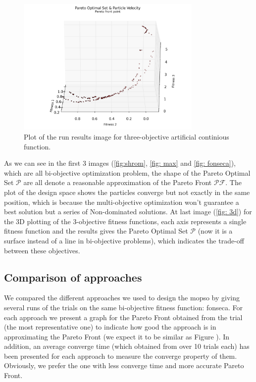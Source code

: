 \documentclass[12pt, runningheads,a4paper]{llncs}
\begin{document}
\begin{figure}
        \centering
    \centering
\includegraphics[width=0.8\textwidth]{./figs/3d.png}
        \caption{Plot of the run results image for three-objective artificial continious function.}\label{fig:3d}
\end{figure}
As we can see in the first 3 images (\ref{fig:shrom}, \ref{fig: max} and \ref{fig: fonseca}), which are all bi-objective optimization problem, the shape of the Pareto Optimal Set  $\mathcal{P}$ are all denote a reasonable approximation of the Pareto Front $\mathcal{PF}$. The plot of the design space shows the particles converge but not exactly in the same position, which is because the multi-objective optimization won't guarantee a best solution but a series of Non-dominated solutions. At last image (\ref{fig: 3d}) for the 3D plotting of the 3-objective fitness functions, each axis represents a single fitness function and the results gives the  Pareto Optimal Set  $\mathcal{P}$ (now it is a surface instead of a line in bi-objective problems), which indicates the trade-off between these objectives.



\subsection{Comparison of approaches}
We compared the different approaches we used to design the \ac{mopso} by giving several runs of the trials on the same bi-objective fitness function: fonseca. For each approach we present a graph for the Pareto Front obtained from the trial (the most representative one) to indicate how good the approach is in approximating the Pareto Front (we expect it to be similar as Figure ). In addition, an average converge time (which obtained from over 10 trials each) has been presented for each approach to measure the converge property of them. Obviously, we prefer the one with less converge time and more accurate Pareto Front.
\end{document}
